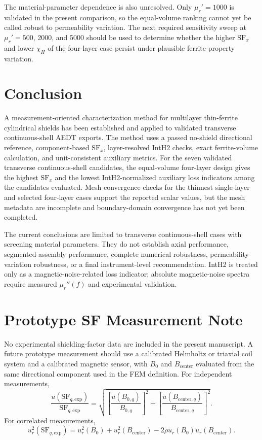 \documentclass[letterpaper,journal]{IEEEtran}
\begin{document}
The material-parameter dependence is also unresolved. Only $\mu_r'=1000$ is validated in the present comparison, so the equal-volume ranking cannot yet be called robust to permeability variation. The next required sensitivity sweep at $\mu_r'=500$, 2000, and 5000 should be used to determine whether the higher $\mathrm{SF}_x$ and lower $\chi_H$ of the four-layer case persist under plausible ferrite-property variation.

\section{Conclusion}

A measurement-oriented characterization method for multilayer thin-ferrite cylindrical shields has been established and applied to validated transverse continuous-shell AEDT exports. The method uses a passed no-shield directional reference, component-based $\mathrm{SF}_x$, layer-resolved IntH2 checks, exact ferrite-volume calculation, and unit-consistent auxiliary metrics. For the seven validated transverse continuous-shell candidates, the equal-volume four-layer design gives the highest $\mathrm{SF}_x$ and the lowest IntH2-normalized auxiliary loss indicators among the candidates evaluated. Mesh convergence checks for the thinnest single-layer and selected four-layer cases support the reported scalar values, but the mesh metadata are incomplete and boundary-domain convergence has not yet been completed.

The current conclusions are limited to transverse continuous-shell cases with screening material parameters. They do not establish axial performance, segmented-assembly performance, complete numerical robustness, permeability-variation robustness, or a final instrument-level recommendation. IntH2 is treated only as a magnetic-noise-related loss indicator; absolute magnetic-noise spectra require measured $\mu_r''(f)$ and experimental validation.

\appendices
\section{Prototype SF Measurement Note}
\label{app:prototype}
No experimental shielding-factor data are included in the present manuscript. A future prototype measurement should use a calibrated Helmholtz or triaxial coil system and a calibrated magnetic sensor, with $B_0$ and $B_{\mathrm{center}}$ evaluated from the same directional component used in the FEM definition. For independent measurements,
\begin{equation}
\frac{u(\mathrm{SF}_{q,\mathrm{exp}})}{\mathrm{SF}_{q,\mathrm{exp}}}
=
\sqrt{
\left[\frac{u(B_{0,q})}{B_{0,q}}\right]^2+
\left[\frac{u(B_{\mathrm{center},q})}{B_{\mathrm{center},q}}\right]^2
}.
\label{eq:uncertainty}
\end{equation}
For correlated measurements,
\begin{equation}
u_r^2(\mathrm{SF}_{q,\mathrm{exp}})=
u_r^2(B_0)+u_r^2(B_{\mathrm{center}})
-2\rho u_r(B_0)u_r(B_{\mathrm{center}}).
\label{eq:corruncertainty}
\end{equation}
\end{document}
